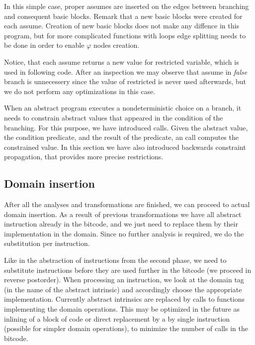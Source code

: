 \begin{example}
In this simple case, proper assumes are inserted on the edges between branching
and consequent basic blocks. Remark that a new basic blocks were created for
each assume. Creation of new basic blocks does not make any diffence in this
program, but for more complicated functions with loops edge splitting needs
to be done in order to enable $\varphi$ nodes creation.

Notice, that each assume returns a new value for restricted variable, which
is used in following code.  After an inspection we may observe that assume
in \emph{false} branch is unnecessery since the value of restricted
 is never used afterwards, but we do not perform any
optimizations in this case.
\end{example}

\begin{summary}
When an abstract program executes a nondeterministic choice on a branch, it
needs to constrain abstract values that appeared in the condition of the
branching. For this purpose, we have introduced  calls. Given
the abstract value, the condition predicate, and the result of the
predicate, an  call computes the constrained value. In this
section we have also introduced backwards constraint propagation, that
provides more precise restrictions.
\end{summary}

\subsection{Domain insertion}

After all the analyses and transformations are finished, we can proceed to
actual domain insertion. As a result of previous transformations we have all
abstract instruction already in the bitcode, and we just need to replace them by
their implementation in the domain. Since no further analysis is required, we do
the substitution per instruction.

Like in the abstraction of instructions from the second phase, we need to
substitute instructions before they are used further in the bitcode (we proceed
in reverse postorder). When processing an instruction, we look at the domain tag
(in the name of the abstract intrinsic) and accordingly choose the appropriate
implementation. Currently abstract intrinsics are replaced by calls to functions
implementing the domain operations. This may be optimized in the future as
inlining of a block of code or direct replacement by a by single instruction
(possible for simpler domain operations), to minimize the number of calls in the
bitcode.

